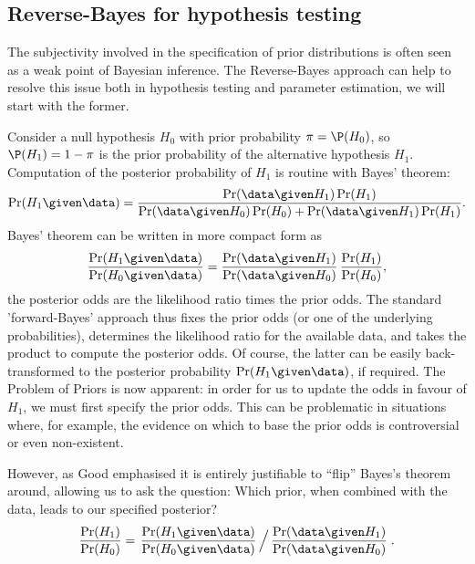 \subsection{Reverse-Bayes for hypothesis testing}
The subjectivity involved in the specification of prior distributions is often
seen as a weak point of Bayesian inference. The Reverse-Bayes approach can help
to resolve this issue both in hypothesis testing and parameter estimation, we
will start with the former.

Consider a null hypothesis $H_0$ with prior probability $\pi=\P(H_0)$, so
$\P(H_1) =1-\pi$ is the prior probability of the alternative hypothesis $H_1$.
Computation of the posterior probability of $H_1$ is routine with Bayes'
theorem:
\begin{equation*}
  \Pr(H_{1} \given \data) = \frac{\Pr(\data \given H_{1}) \Pr(H_{1})}{\Pr(\data \given H_{0}) \Pr(H_{0}) +
    \Pr(\data \given H_{1}) \Pr(H_{1})}.
\end{equation*}
Bayes' theorem can be written in more compact form as
\begin{equation}\label{eq4:eq0}
  \frac{\Pr(H_{1} \given \data)}{\Pr(H_{0} \given \data)} =
  \frac{\Pr(\data \given H_{1})}{\Pr(\data \given H_{0})} \,  \frac{\Pr(H_{1})}{\Pr(H_{0})},
\end{equation}
\ie{} the posterior odds are the likelihood ratio times the prior odds. The
standard 'forward-Bayes' approach thus fixes the prior odds (or one of the
underlying probabilities), determines the likelihood ratio for the available
data, and takes the product to compute the posterior odds. Of course, the latter
can be easily back-transformed to the posterior probability
$\Pr(H_{1} \given \data)$, if required. The Problem of Priors is now apparent:
in order for us to update the odds in favour of $H_1$, we must first specify the
prior odds. This can be problematic in situations where, for example, the
evidence on which to base the prior odds is controversial or even non-existent.

However, as Good emphasised it is entirely justifiable to ``flip'' Bayes's
theorem around, allowing us to ask the question: Which prior, when combined with
the data, leads to our specified posterior?
\begin{equation}\label{eq4:eq1}
  \frac{\Pr(H_{1})}{\Pr(H_{0})} = \left. \frac{\Pr(H_{1} \given \data)}{\Pr(H_{0} \given \data)} \, \Big/
\,   \frac{\Pr(\data \given H_{1})}{\Pr(\data \given H_{0})} \right. .
\end{equation}

